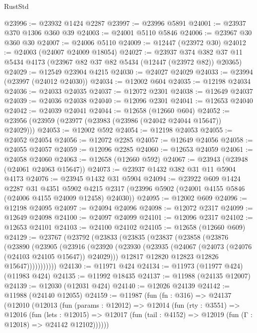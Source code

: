 \begin{lexlean}{RustStd}
\begin{coremodule}
@23996 := @23932 @1424 @2287
@23997 := @23996 @5891
@24001 := @23937 @370 @1306 @360 @39
@24003 := @24001 @5110 @5846
@24006 := @23967 @30 @360 @30
@24007 := @24006 @5110
@24009 := @12447 (@23972 @30)
@24012 := @24003 (@24007 @24009 @18054)
@24027 := @23937
    @374
    @382
    @37
    @11
    @5434
    @4173
    (@23967 @82 @37 @82 @5434 (@12447 (@23972 @82)) @20365)
@24029 := @12549 @23904 @4215
@24030 := @24027 @24029
@24033 := @23994 (@23997 (@24012 @24030))
@24034 := @12002 @604
@24035 := @12198 @24034
@24036 := @24033 @24035
@24037 := @12072 @2301
@24038 := @12649 @24037
@24039 := @24036 @24038
@24040 := @12096 @2301
@24041 := @12653 @24040
@24042 := @24039 @24041
@24044 := @12658 (@12660 @604)
@24052 := @23956 (@23959 (@23977 (@23983 (@23986 (@24042 @24044 @15647)) @24029)))
@24053 := @12002 @592
@24054 := @12198 @24053
@24055 := @24052 @24054
@24056 := @12072 @2285
@24057 := @12649 @24056
@24058 := @24055 @24057
@24059 := @12096 @2285
@24060 := @12653 @24059
@24061 := @24058 @24060
@24063 := @12658 (@12660 @592)
@24067 := @23943 (@23948 (@24061 @24063 @15647))
@24073 := @23937 @1432 @382 @31 @11 @5904 @4173
@24076 := @23945 @1432 @31 @5904
@24094 := @23922
    @609
    @1424
    @2287
    @31
    @4351
    @5902
    @4215
    @2317
    (@23996 @5902 (@24001 @4155 @5846 (@24006 @4155 @24009 @12458) @24030))
@24095 := @12002 @609
@24096 := @12198 @24095
@24097 := @24094 @24096
@24098 := @12072 @2317
@24099 := @12649 @24098
@24100 := @24097 @24099
@24101 := @12096 @2317
@24102 := @12653 @24101
@24103 := @24100 @24102
@24105 := @12658 (@12660 @609)
@24129 := @23767
    (@23792
      (@23833
        (@23835
          (@23837
            (@23858
              (@23876
                (@23890
                  (@23905
                    (@23916
                      (@23920
                        (@23930
                          (@23935 (@24067 (@24073 (@24076 (@24103 @24105 @15647)) @24029)))
                          @12817
                          @12820
                          @12823
                          @12826
                          @15647)))))))))))
@24130 := @11971 @424
@24134 := @11973 (@11977 @424) (@11983 @424)
@24135 := @11992 @18435
@24137 := @11988 (@24135 @12007)
@24139 := @12030 (@12031 @424)
@24140 := @12026 @24139
@24142 := @11988 (@24140 @12055)
@24159 := @11987
    (fun (fn : @316) =>
    @24137
      (@12010
        (@12013
          (fun (params : @12012) =>
          @12014
            (fun (rty : @3551) =>
            @12016
              (fun (lets : @12015) =>
              @12017 (fun (tail : @4152) => @12019 (fun (Γ : @12018) => @24142 @12102))))))

\end{coremodule}
\end{lexlean}
